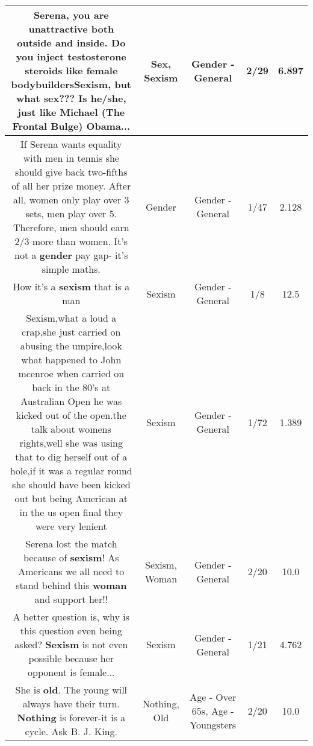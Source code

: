\documentclass[11pt]{article}
\newlength\mylength
\begin{document}
\begin{center}
\begin{longtable}{|C{.65\mylength}|C{.30\mylength}|C{.12\mylength}|C{.12\mylength}|C{.12\mylength}|}
  \small Serena, you are unattractive both outside and inside. Do you inject testosterone steroids like female bodybuilders\textbf{Sexism}, but what \textbf{sex}??? Is he/she, just like Michael (The Frontal Bulge) Obama...\normalsize   & Sex, Sexism & Gender - General & 2/29 & 6.897 \\  \hline
  \small If Serena wants equality with men in tennis she should give back two-fifths of all her prize money. After all, women only play over 3 sets, men play over 5. Therefore, men should earn 2/3 more than women. It's not a \textbf{gender} pay gap- it's simple maths.\normalsize   & Gender & Gender - General & 1/47 & 2.128 \\  \hline
  \small How it's a \textbf{sexism} that is a man\normalsize   & Sexism & Gender - General & 1/8 & 12.5 \\  \hline
  \small Sexism,what a loud a crap,she just carried on abusing the umpire,look what happened to John mcenroe when carried on back in the 80's at Australian Open he was kicked out of the open.the talk about womens rights,well she was using that to dig herself out of a hole,if it was a regular round she should have been kicked out but being American at in the us open final they were very lenient\normalsize   & Sexism & Gender - General & 1/72 & 1.389 \\  \hline
  \small Serena lost the match because of \textbf{sexism}!  As Americans we all need to stand behind this \textbf{woman} and support her!!\normalsize   & Sexism, Woman & Gender - General & 2/20 & 10.0 \\  \hline
  \small A better question is, why is this question even being asked? \textbf{Sexism} is not even possible because her opponent is female...\normalsize   & Sexism & Gender - General & 1/21 & 4.762 \\  \hline
  \small She is \textbf{old}. The young will always have their turn. \textbf{Nothing} is forever-it is a cycle. Ask B. J. King.\normalsize   & Nothing, Old & Age - Over 65s, Age - Youngsters & 2/20 & 10.0 \\  \hline

\end{longtable}
\end{center}
\end{document}
